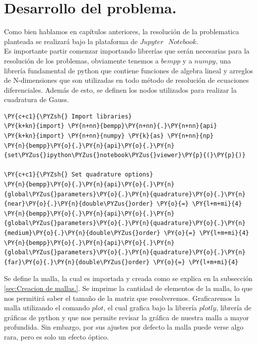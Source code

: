 \section{Desarrollo del problema.}
\setcounter{figure}{0}
\setcounter{equation}{0}
Como bien hablamos en capítulos anteriores, la resolución de la problematica planteada se realizará bajo la plataforma de $Jupyter\text{ }Notebook$. \\
Es importante partir comenzar importando librerías que serán necesarias para la resolución de los problemas, obviamente tenemos a $bempp$ y a $numpy$, una librería fundamental de python que contiene funciones de algebra lineal y arreglos de N-dimensiones que son utilizadas en todo método de resolución de ecuaciones diferenciales. Además de esto, se definen los nodos utilizados para realizar la cuadratura de Gauss.
\begin{tcolorbox}
\begin{Verbatim}[commandchars=\\\{\}]
\PY{c+c1}{\PYZsh{} Import libraries}
\PY{k+kn}{import} \PY{n+nn}{bempp}\PY{n+nn}{.}\PY{n+nn}{api}
\PY{k+kn}{import} \PY{n+nn}{numpy} \PY{k}{as} \PY{n+nn}{np}
\PY{n}{bempp}\PY{o}{.}\PY{n}{api}\PY{o}{.}\PY{n}{set\PYZus{}ipython\PYZus{}notebook\PYZus{}viewer}\PY{p}{(}\PY{p}{)}

\PY{c+c1}{\PYZsh{} Set quadrature options}        
\PY{n}{bempp}\PY{o}{.}\PY{n}{api}\PY{o}{.}\PY{n}{global\PYZus{}parameters}\PY{o}{.}\PY{n}{quadrature}\PY{o}{.}\PY{n}{near}\PY{o}{.}\PY{n}{double\PYZus{}order} \PY{o}{=} \PY{l+m+mi}{4}
\PY{n}{bempp}\PY{o}{.}\PY{n}{api}\PY{o}{.}\PY{n}{global\PYZus{}parameters}\PY{o}{.}\PY{n}{quadrature}\PY{o}{.}\PY{n}{medium}\PY{o}{.}\PY{n}{double\PYZus{}order} \PY{o}{=} \PY{l+m+mi}{4}
\PY{n}{bempp}\PY{o}{.}\PY{n}{api}\PY{o}{.}\PY{n}{global\PYZus{}parameters}\PY{o}{.}\PY{n}{quadrature}\PY{o}{.}\PY{n}{far}\PY{o}{.}\PY{n}{double\PYZus{}order} \PY{o}{=} \PY{l+m+mi}{4}
\end{Verbatim}
\end{tcolorbox}
Se define la malla, la cual es importada y creada como se explica en la subsección \ref{sec:Creacion de mallas.}. Se imprime la cantidad de elementos de la malla, lo que nos permitirá saber el tamaño de la matriz que resolveremos. Graficaremos la malla utilizando el comando $plot$, el cual grafica bajo la librería $plotly$, librería de gráficas de python y que nos permite revisar la gráfica de nuestra malla a mayor profundida. Sin embargo, por sus ajustes por defecto la malla puede verse algo rara, pero es solo un efecto óptico. 

